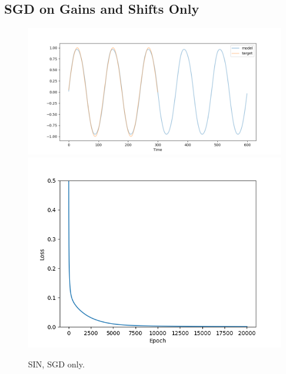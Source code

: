 \documentclass[12pt, a4paper]{article}
\begin{document}
\subsection*{SGD on Gains and Shifts Only}

\begin{figure}[H]
    \centering
    \includegraphics[width=\textwidth]{RNN/ourRNN/analysis/fig/1016_SIN_bpgain_output.png}\\
    \includegraphics[width=\textwidth]{RNN/ourRNN/analysis/fig/1016_SIN_bpgain_loss.png}
    \caption{SIN, SGD only.}
\end{figure}
\end{document}
